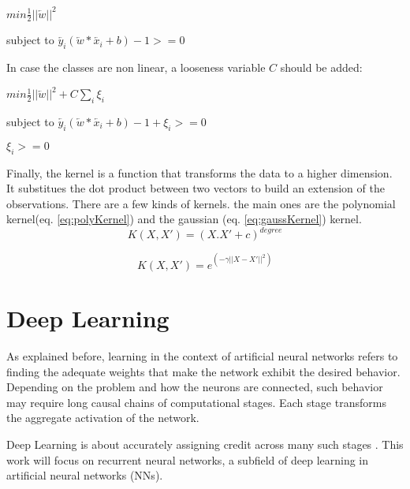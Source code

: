 \centerline{$min \frac{1}{2}||\overleftarrow{w}||^2$\\}
\centerline{subject to $\overleftarrow{y_i} (\overleftarrow{w}*\overleftarrow{x_i}+b)-1>=0$ \\}

In case the classes are non linear, a looseness variable $C$ should be added: \\
\centerline{$min \frac{1}{2}||\overleftarrow{w}||^2+C\sum_{i}\xi_i$\\}
\centerline{subject to $\overleftarrow{y_i} (\overleftarrow{w}*\overleftarrow{x_i}+b)-1+\xi_i>=0$\\}
\centerline{$\xi_i>=0$}

Finally, the kernel is a function that transforms the data to a higher dimension. It substitues the dot product between two vectors to build an extension of the observations. There are a few kinds of kernels. the main ones are the polynomial kernel(eq. \ref{eq:polyKernel}) and the gaussian (eq. \ref{eq:gaussKernel}) kernel.
\begin{equation} \label{eq:polyKernel}
K(X,X')=(X.X'+c)^{degree}
\end{equation}

\begin{equation} \label{eq:gaussKernel}
K(X,X')=e^{(-\gamma ||X-X'||^2)}
\end{equation}

\section{Deep Learning}
As explained before, learning in the context of artificial neural networks refers to finding the adequate weights that make the network exhibit the desired behavior. Depending on the problem and how the neurons are connected, such behavior may require long causal chains of computational stages. Each stage transforms the aggregate activation of the network.

Deep Learning is about accurately assigning credit across many such stages \cite{schmidhuber2015deep}. This work will focus on recurrent neural networks, a subfield of deep learning in artificial neural networks (NNs).

